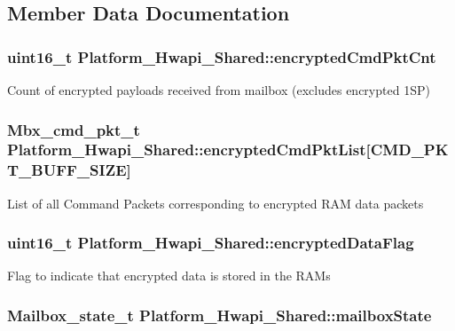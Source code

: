 \subsection{Member Data Documentation}
\hypertarget{structPlatform__Hwapi__Shared_aad57f2ce10ee9e9c2d85546430b79836}{
\subsubsection[{encrypted\-Cmd\-Pkt\-Cnt}]{\setlength{\rightskip}{0pt plus 5cm}uint16\-\_\-t Platform\-\_\-\-Hwapi\-\_\-\-Shared\-::encrypted\-Cmd\-Pkt\-Cnt}}\label{structPlatform__Hwapi__Shared_aad57f2ce10ee9e9c2d85546430b79836}
Count of encrypted payloads received from mailbox (excludes encrypted 1\-S\-P) \hypertarget{structPlatform__Hwapi__Shared_a7b45e4666a52bb69f129b5be524b7a3f}{
\subsubsection[{encrypted\-Cmd\-Pkt\-List}]{\setlength{\rightskip}{0pt plus 5cm}Mbx\-\_\-cmd\-\_\-pkt\-\_\-t Platform\-\_\-\-Hwapi\-\_\-\-Shared\-::encrypted\-Cmd\-Pkt\-List\mbox{[}C\-M\-D\-\_\-\-P\-K\-T\-\_\-\-B\-U\-F\-F\-\_\-\-S\-I\-Z\-E\mbox{]}}}\label{structPlatform__Hwapi__Shared_a7b45e4666a52bb69f129b5be524b7a3f}
List of all Command Packets corresponding to encrypted R\-A\-M data packets \hypertarget{structPlatform__Hwapi__Shared_a7bcb04a0f8ea2b7245505bcbf0f2be43}{
\subsubsection[{encrypted\-Data\-Flag}]{\setlength{\rightskip}{0pt plus 5cm}uint16\-\_\-t Platform\-\_\-\-Hwapi\-\_\-\-Shared\-::encrypted\-Data\-Flag}}\label{structPlatform__Hwapi__Shared_a7bcb04a0f8ea2b7245505bcbf0f2be43}
Flag to indicate that encrypted data is stored in the R\-A\-Ms \hypertarget{structPlatform__Hwapi__Shared_a3fc3d581f0eda3d5a05842fd09fbb365}{
\subsubsection[{mailbox\-State}]{\setlength{\rightskip}{0pt plus 5cm}Mailbox\-\_\-state\-\_\-t Platform\-\_\-\-Hwapi\-\_\-\-Shared\-::mailbox\-State}}\label{structPlatform__Hwapi__Shared_a3fc3d581f0eda3d5a05842fd09fbb365}
